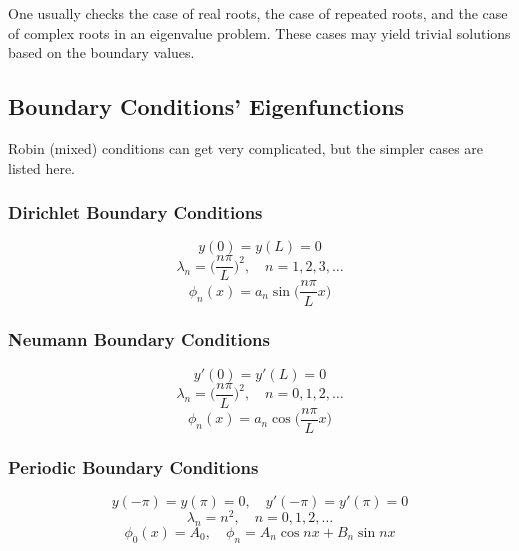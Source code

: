 One usually checks the case of real roots, the case of repeated roots, and the case of complex roots in an eigenvalue problem. These cases may yield trivial solutions based on the boundary values.


\subsection{Boundary Conditions' Eigenfunctions}
Robin (mixed) conditions can get very complicated, but the simpler cases are listed here.
\subsubsection{Dirichlet Boundary Conditions}
\begin{equation*}
    y(0)=y(L)=0
\end{equation*}
\begin{equation} \label{eq:HO-dirichlet-eigenvalues}
    \lambda_n = \Big(\frac{n\pi}{L}\Big)^2, \quad n=1,2,3,\dots
\end{equation}
\begin{equation}\label{eq:HO-dirichlet-eigenfuncs}
    \phi_n(x)=a_n \sin\Big(\frac{n\pi}{L}x\Big)
\end{equation}

\subsubsection{Neumann Boundary Conditions}
\begin{equation*}
    y'(0)=y'(L)=0
\end{equation*}
\begin{equation} \label{eq:HO-neumann-eigenvalues}
    \lambda_n = \Big(\frac{n\pi}{L}\Big)^2, \quad n=0,1,2,\dots
\end{equation}
\begin{equation}\label{eq:HO-neumann-eigenfuncs}
    \phi_n(x)=a_n \cos\Big(\frac{n\pi}{L}x\Big)
\end{equation}

\subsubsection{Periodic Boundary Conditions}
\begin{equation*}
    y(-\pi)=y(\pi)=0, \quad y'(-\pi)=y'(\pi)=0
\end{equation*}
\begin{equation} \label{eq:HO-periodic-eigenvalues}
    \lambda_n = n^2, \quad n=0,1,2,\dots
\end{equation}
\begin{equation}\label{eq:HO-periodic-eigenfuncs}
    \phi_0(x)=A_0, \quad \phi_n = A_n\cos{nx} + B_n\sin{nx}
\end{equation}



